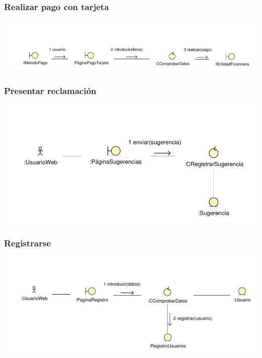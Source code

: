 \documentclass[11pt, a4paper, twoside, titlepage]{article}
\begin{document}
			\subsubsection{Realizar pago con tarjeta} \label{ana:tarjeta}
				\begin{center}
					\includegraphics[scale=.7]{analisis/diagramas/pagotarjeta.pdf}
				\end{center}

			\subsubsection{Presentar reclamación}
				\begin{center}
					\includegraphics[scale=.82]{analisis/diagramas/presentarreclamacion.pdf}
				\end{center}

			\subsubsection{Registrarse}
				\begin{center}
					\includegraphics[scale=.8]{analisis/diagramas/registrarse.pdf}
				\end{center}
\end{document}
